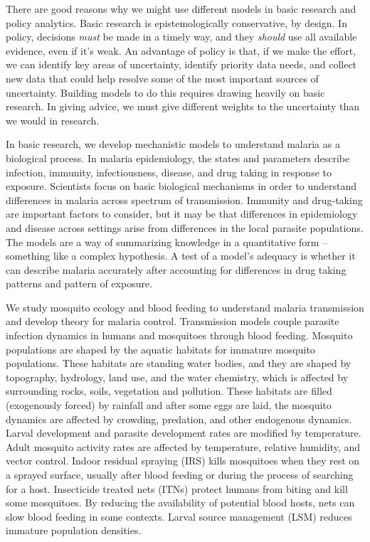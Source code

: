 \documentclass[
]{book}
\begin{document}
There are good reasons why we might use different models in basic research and policy analytics. Basic research is epistemologically conservative, by design. In policy, decisions \emph{must} be made in a timely way, and they \emph{should} use all available evidence, even if it's weak. An advantage of policy is that, if we make the effort, we can identify key areas of uncertainty, identify priority data needs, and collect new data that could help resolve some of the most important sources of uncertainty. Building models to do this requires drawing heavily on basic research. In giving advice, we must give different weights to the uncertainty than we would in research.

In basic research, we develop mechanistic models to understand malaria as a biological process. In malaria epidemiology, the states and parameters describe infection, immunity, infectiousness, disease, and drug taking in response to exposure. Scientists focus on basic biological mechanisms in order to understand differences in malaria across spectrum of transmission. Immunity and drug-taking are important factors to consider, but it may be that differences in epidemiology and disease across settings arise from differences in the local parasite populations. The models are a way of summarizing knowledge in a quantitative form -- something like a complex hypothesis. A test of a model's adequacy is whether it can describe malaria accurately after accounting for differences in drug taking patterns and pattern of exposure.

We study mosquito ecology and blood feeding to understand malaria transmission and develop theory for malaria control. Transmission models couple parasite infection dynamics in humans and mosquitoes through blood feeding. Mosquito populations are shaped by the aquatic habitats for immature mosquito populations. These habitats are standing water bodies, and they are shaped by topography, hydrology, land use, and the water chemistry, which is affected by surrounding rocks, soils, vegetation and pollution. These habitats are filled (exogenously forced) by rainfall and after some eggs are laid, the mosquito dynamics are affected by crowding, predation, and other endogenous dynamics. Larval development and parasite development rates are modified by temperature. Adult mosquito activity rates are affected by temperature, relative humidity, and vector control. Indoor residual spraying (IRS) kills mosquitoes when they rest on a sprayed surface, usually after blood feeding or during the process of searching for a host. Insecticide treated nets (ITNs) protect humans from biting and kill some mosquitoes. By reducing the availability of potential blood hosts, nets can slow blood feeding in some contexts. Larval source management (LSM) reduces immature population densities.
\end{document}
